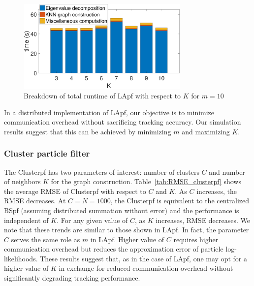 \documentclass[10pt,letterpaper,final]{article}
\begin{document}
\begin{figure}
\centering
\includegraphics[width=0.75\textwidth]{Figures/time_bar_LApf.pdf}
\caption{Breakdown of total runtime of LApf with respect to $K$ for $m=10$}
\label{fig:time_bar_LApf}
\end{figure}

In a distributed implementation of LApf, our objective is to minimize communication overhead without sacrificing tracking accuracy. Our simulation results suggest that this can be achieved by minimizing $m$ and maximizing $K$. 

\subsubsection{Cluster particle filter}
The Clusterpf has two parameters of interest: number of clusters $C$ and number of neighbors $K$ for the graph construction. Table~\ref{tab:RMSE_clusterpf} shows the average RMSE of Clusterpf with respect to $C$ and $K$. As $C$ increases, the RMSE decreases. At $C=N=1000$, the Clusterpf is equivalent to the centralized BSpf (assuming distributed summation without error) and the performance is independent of $K$. For any given value of $C$, as $K$ increases, RMSE decreases. We note that these trends are similar to those shown in LApf. In fact, the parameter $C$ serves the same role as $m$ in LApf. Higher value of $C$ requires higher communication overhead but reduces the approximation error of particle log-likelihoods. These results suggest that, as in the case of LApf, one may opt for a higher value of $K$ in exchange for reduced communication overhead without significantly degrading tracking performance.
\end{document}
